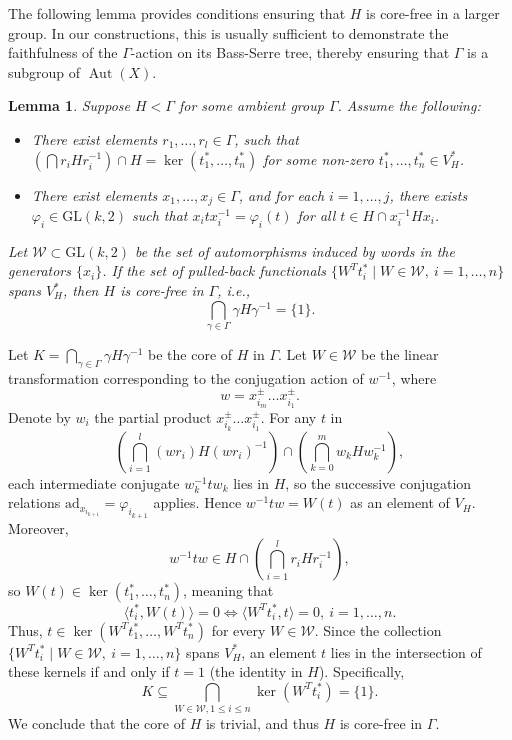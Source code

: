 \documentclass[12pt,leqno]{amsart}
\makeatletter
\renewenvironment{proof}[1][\proofname]{%
	\par
	\pushQED{\qed}%
	\normalfont
	\topsep6\p@\@plus6\p@\relax
	\trivlist
	\item[\hskip\labelsep\itshape #1\@addpunct{.}]%
	\ignorespaces
}{%
	\par\nobreak\vspace{2pt}%
	\popQED%
	\medskip%
	\endtrivlist
	\@endpefalse
}
\newcommand{\2}{L^2_{\rm per}(0, T)}
\newtheorem{lem}{Lemma}[section]
\newcommand{\aut}{{\operatorname{Aut}}}
\numberwithin{equation}{section}
\numberwithin{figure}{section}
\makeatother
\begin{document}
The following lemma provides conditions ensuring that $H$ is core-free in a larger group. In our constructions, this is usually sufficient to demonstrate the faithfulness of the $\Gamma$-action on its Bass-Serre tree, thereby ensuring that $\Gamma$ is a subgroup of $\aut(X)$.
\begin{lem}\label{lem:faithful}
    Suppose $H < \Gamma$ for some ambient group $\Gamma$. Assume the following:
    \begin{itemize}
        \item There exist elements $r_1,\dots, r_l\in \Gamma$, such that $(\bigcap r_i H r_i^{-1}) \cap H = \ker(t_1^*,\dots, t_n^*)$ for some non-zero $t_1^*,\dots, t_n^* \in V_H^*$.
        \item There exist elements $x_1, \dots, x_j\in \Gamma$, and for each $i=1,\dots,j$, there exists $\varphi_i \in \mathrm{GL}(k, 2)$ such that $x_i t x_i^{-1} = \varphi_i(t)$ for all $t \in H \cap x_i^{-1} H x_i$.
    \end{itemize}
    Let $\mathcal{W} \subset \mathrm{GL}(k, 2)$ be the set of automorphisms induced by words in the generators $\{x_i\}$. If the set of pulled-back functionals $\{ W^T t_i^* \mid W \in \mathcal{W},\ i=1,\dots,n \}$ spans $V_H^*$, then $H$ is \emph{core-free} in $\Gamma$, i.e.,
    \[
    \bigcap_{\gamma\in\Gamma}\gamma H\gamma^{-1} = \{1\}.
    \]
\end{lem}
\begin{proof}
    Let $K = \bigcap_{\gamma \in \Gamma} \gamma H \gamma^{-1}$ be the core of $H$ in $\Gamma$. Let $W \in \mathcal{W}$ be the linear transformation corresponding to the conjugation action of $w^{-1}$, where
    \[
    w = x_{i_m}^\pm\dots x_{i_1}^\pm.
    \]
    Denote by $w_i$ the partial product $x_{i_k}^\pm\dots x_{i_1}^\pm$. For any $t$ in
    \[
    \left(\bigcap_{i=1}^l(wr_i)H(wr_i)^{-1}\right)\cap\left(\bigcap_{k=0}^m w_kHw_k^{-1}\right),
    \]
    each intermediate conjugate $w_k^{-1}tw_k$ lies in $H$, so the successive conjugation relations $\mathrm{ad}_{x_{i_{k+1}}} = \varphi_{i_{k+1}}$ applies. Hence $w^{-1}tw = W(t)$ as an element of $V_H$. Moreover,
    \[
    w^{-1}tw \in H\cap\left(\bigcap_{i=1}^l r_iHr_i^{-1}\right),
    \]
    so $W(t)\in \ker(t_1^*,\dots,t_n^*)$, meaning that
    \[
    \langle t_i^*, W(t) \rangle = 0 \iff \langle W^T t_i^*, t \rangle = 0,\ i=1,\dots,n.
    \]
    Thus, $t \in \ker(W^T t_1^*,\dots,W^T t_n^*)$ for every $W \in \mathcal{W}$. Since the collection $\{ W^T t_i^* \mid W \in \mathcal{W},\ i=1,\dots,n \}$ spans $V_H^*$, an element $t$ lies in the intersection of these kernels if and only if $t = 1$ (the identity in $H$). Specifically,
    \[
    K \subseteq \bigcap_{W \in \mathcal{W},1\leq i\leq n} \ker(W^T t_i^*) = \{ 1 \}.
    \]
    We conclude that the core of $H$ is trivial, and thus $H$ is core-free in $\Gamma$.
\end{proof}
\end{document}
